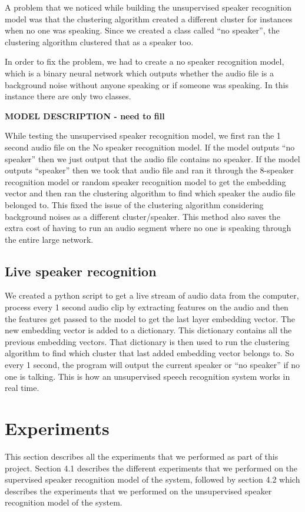 \documentclass[10pt,twocolumn,letterpaper]{article}
\begin{document}
A problem that we noticed while building the unsupervised speaker recognition model was that the clustering algorithm created a different cluster for instances when no one was speaking. Since we created a class called “no speaker”, the clustering algorithm clustered that as a speaker too.

In order to fix the problem, we had to create a no speaker recognition model, which is a binary neural network which outputs whether the audio file is a background noise without anyone speaking or if someone was speaking. In this instance there are only two classes.

\textbf{MODEL DESCRIPTION - need to fill}


While testing the unsupervised speaker recognition model, we first ran the 1 second audio file on the No speaker recognition model. If the model outputs “no speaker” then we just output that the audio file contains no speaker. If the model outputs “speaker” then we took that audio file and ran it through the 8-speaker recognition model or random speaker recognition model to get the embedding vector and then ran the clustering algorithm to find which speaker the audio file belonged to. This fixed the issue of the clustering algorithm considering background noises as a different cluster/speaker. This method also saves the extra cost of having to run an audio segment where no one is speaking through the entire large network.

\subsection{Live speaker recognition}

We created a python script to get a live stream of audio data from the computer, process every 1 second audio clip by extracting features on the audio and then the features get passed to the model to get the last layer embedding vector. The new embedding vector is added to a dictionary. This dictionary contains all the previous embedding vectors. That dictionary is then used to run the clustering algorithm to find which cluster that last added embedding vector belongs to. So every 1 second, the program will output the current speaker or “no speaker” if no one is talking. This is how an unsupervised speech recognition system works in real time.


\section{Experiments}
This section describes all the experiments that we performed as part of this project. Section 4.1 describes the different experiments that we performed on the supervised speaker recognition model of the system, followed by section 4.2 which describes the experiments that we performed on the unsupervised speaker recognition model of the system.
\end{document}
